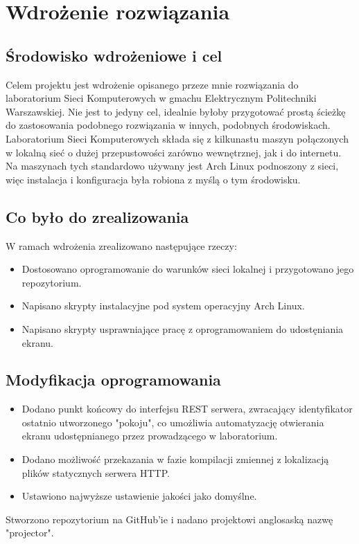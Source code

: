 \documentclass[a4paper,11pt]{article}
\begin{document}
    \section{Wdrożenie rozwiązania} 
        \subsection{Środowisko wdrożeniowe i cel}
        Celem projektu jest wdrożenie opisanego przeze mnie rozwiązania do laboratorium Sieci Komputerowych w gmachu Elektrycznym Politechniki Warszawskiej. 
        Nie jest to jedyny cel, idealnie byłoby przygotować prostą ścieżkę do zastosowania podobnego rozwiązania w innych, podobnych środowiskach.    
        Laboratorium Sieci Komputerowych składa się z kilkunastu maszyn połączonych w lokalną sieć o dużej przepustowości zarówno wewnętrznej, jak i do internetu.
        Na maszynach tych standardowo używany jest Arch Linux podnoszony z sieci, więc instalacja i konfiguracja była robiona z myślą o tym środowisku.  
        \subsection{Co było do zrealizowania}
        W ramach wdrożenia zrealizowano następujące rzeczy: 
        \begin{itemize}
            \item Dostosowano oprogramowanie do warunków sieci lokalnej i przygotowano jego repozytorium.
            \item Napisano skrypty instalacyjne pod system operacyjny Arch Linux.
            \item Napisano skrypty usprawniające pracę z oprogramowaniem do udostęniania ekranu.
        \end{itemize}
        \subsection{Modyfikacja oprogramowania}
        \begin{itemize}
            \item Dodano punkt końcowy do interfejsu REST serwera, zwracający identyfikator ostatnio utworzonego "pokoju", co umożliwia automatyzację otwierania ekranu udostępnianego przez prowadzącego w laboratorium.  
            \item Dodano możliwość przekazania w fazie kompilacji zmiennej z lokalizacją plików statycznych serwera HTTP.
            \item Ustawiono najwyższe ustawienie jakości jako domyślne. 
        \end{itemize}
        Stworzono repozytorium na GitHub'ie\cite{1} i nadano projektowi anglosaską nazwę "projector".
\end{document}
